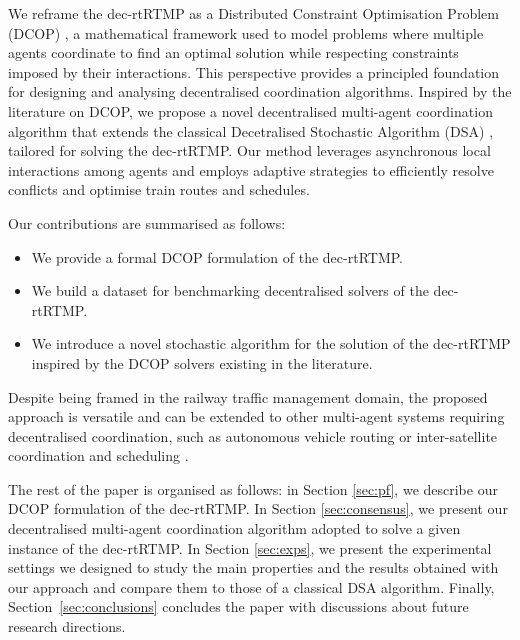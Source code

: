 We reframe the dec-rtRTMP as a Distributed Constraint Optimisation Problem (DCOP) \cite{fioretto2018distributed}, a mathematical framework used to model problems where multiple agents coordinate to find an optimal solution while respecting constraints imposed by their interactions. This perspective provides a principled foundation for designing and analysing decentralised coordination algorithms. Inspired by the literature on DCOP, we propose a novel decentralised multi-agent coordination algorithm that extends the classical Decetralised Stochastic Algorithm (DSA) \cite{fitzpatrick2003distributed}, tailored for solving the dec-rtRTMP. Our method leverages asynchronous local interactions among agents and employs adaptive strategies to efficiently resolve conflicts and optimise train routes and schedules.

Our contributions are summarised as follows:
\begin{itemize}
    \item We provide a formal DCOP formulation of the dec-rtRTMP.
    \item We build a dataset for benchmarking decentralised solvers of the dec-rtRTMP.
    \item We introduce a novel stochastic algorithm for the solution of the dec-rtRTMP inspired by the DCOP solvers existing in the literature.
\end{itemize}

Despite being framed in the railway traffic management domain, the proposed approach is versatile and can be extended to other multi-agent systems requiring decentralised coordination, such as autonomous vehicle routing \cite{9078053} or inter-satellite coordination and scheduling \cite{picard:hal-03181968,YANG20214505}.

The rest of the paper is organised as follows: in Section \ref{sec:pf}, we describe our DCOP formulation of the dec-rtRTMP. In Section \ref{sec:consensus}, we present our decentralised multi-agent coordination algorithm adopted to solve a given instance of the dec-rtRTMP. In Section \ref{sec:exps}, we present the experimental settings we designed to study the main properties and the results obtained with our approach and compare them to those of a classical DSA algorithm. Finally, Section~\ref{sec:conclusions} concludes the paper with discussions about future research directions.

